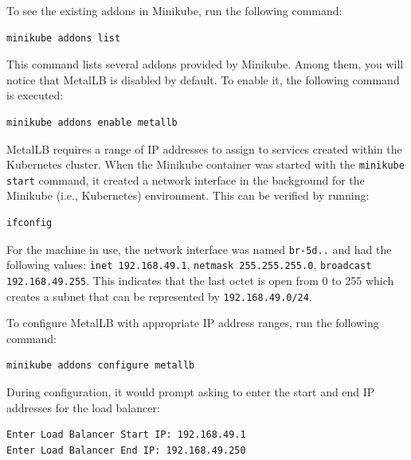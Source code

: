 To see the existing addons in Minikube, run the following command:

\begin{lstlisting}[breaklines=true,basicstyle=\small\ttfamily,frame=single]
minikube addons list
\end{lstlisting}

This command lists several addons provided by Minikube. Among them, you will notice that MetalLB is disabled by default. To enable it, the following command is executed:

\begin{lstlisting}[breaklines=true,basicstyle=\small\ttfamily,frame=single]
minikube addons enable metallb
\end{lstlisting}

MetalLB requires a range of IP addresses to assign to services created within the Kubernetes cluster. When the Minikube container was started with the \texttt{minikube start} command, it created a network interface in the background for the Minikube (i.e., Kubernetes) environment. This can be verified by running:

\begin{lstlisting}[breaklines=true,basicstyle=\small\ttfamily,frame=single]
ifconfig
\end{lstlisting}

For the machine in use, the network interface was named \texttt{br-5d..} and had the following values: \texttt{inet 192.168.49.1}, \texttt{netmask 255.255.255.0}, \texttt{broadcast 192.168.49.255}. This indicates that the last octet is open from 0 to 255 which creates a subnet that can be represented by \texttt{192.168.49.0/24}.

To configure MetalLB with appropriate IP address ranges, run the following command:

\begin{lstlisting}[breaklines=true,basicstyle=\small\ttfamily,frame=single]
minikube addons configure metallb
\end{lstlisting}

During configuration, it would prompt asking to enter the start and end IP addresses for the load balancer:

\begin{lstlisting}[breaklines=true,basicstyle=\small\ttfamily,frame=single]
Enter Load Balancer Start IP: 192.168.49.1
Enter Load Balancer End IP: 192.168.49.250
\end{lstlisting}


